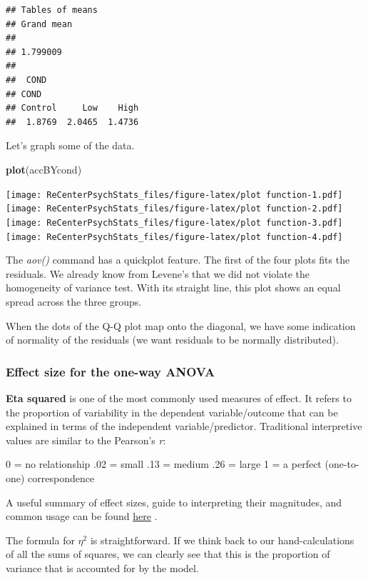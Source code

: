 \documentclass[
  english,
]{book}
\newenvironment{Shaded}{\begin{snugshade}}{\end{snugshade}}
\newcommand{\KeywordTok}[1]{\textcolor[rgb]{0.13,0.29,0.53}{\textbf{#1}}}
\newcommand{\NormalTok}[1]{#1}
\begin{document}
\begin{verbatim}
## Tables of means
## Grand mean
##          
## 1.799009 
## 
##  COND 
## COND
## Control     Low    High 
##  1.8769  2.0465  1.4736
\end{verbatim}

Let's graph some of the data.

\begin{Shaded}
\begin{Highlighting}[]
\KeywordTok{plot}\NormalTok{(accBYcond) }
\end{Highlighting}
\end{Shaded}

\texttt{[image: ReCenterPsychStats\_files/figure-latex/plot function-1.pdf]} \texttt{[image: ReCenterPsychStats\_files/figure-latex/plot function-2.pdf]} \texttt{[image: ReCenterPsychStats\_files/figure-latex/plot function-3.pdf]} \texttt{[image: ReCenterPsychStats\_files/figure-latex/plot function-4.pdf]}

The \emph{aov()} command has a quickplot feature. The first of the four plots fits the residuals. We already know from Levene's that we did not violate the homogeneity of variance test. With its straight line, this plot shows an equal spread across the three groups.

When the dots of the Q-Q plot map onto the diagonal, we have some indication of normality of the residuals (we want residuals to be normally distributed).

\hypertarget{effect-size-for-the-one-way-anova}{%
\subsubsection{Effect size for the one-way ANOVA}\label{effect-size-for-the-one-way-anova}}

\textbf{Eta squared} is one of the most commonly used measures of effect. It refers to the proportion of variability in the dependent variable/outcome that can be explained in terms of the independent variable/predictor. Traditional interpretive values are similar to the Pearson's \emph{r}:

0 = no relationship
.02 = small
.13 = medium
.26 = large
1 = a perfect (one-to-one) correspondence

A useful summary of effect sizes, guide to interpreting their magnitudes, and common usage can be found \href{https://imaging.mrc-cbu.cam.ac.uk/statswiki/FAQ/effectSize}{here} \citep{watson_rules_2020}.

The formula for \(\eta^2\) is straightforward. If we think back to our hand-calculations of all the sums of squares, we can clearly see that this is the proportion of variance that is accounted for by the model.
\end{document}
